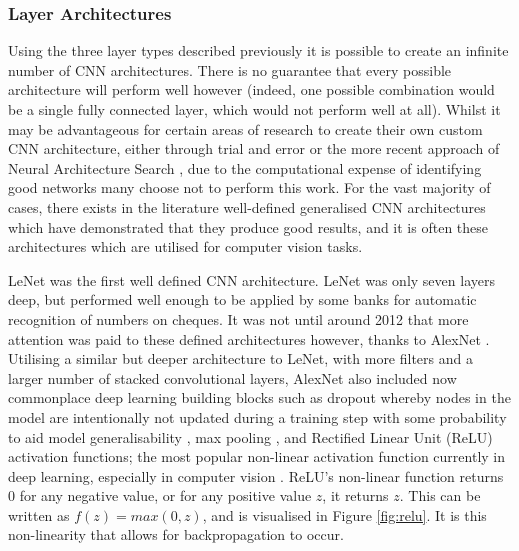 \subsubsection{Layer Architectures}\label{ch:Background,sec:CNN,sub:CNN,subsub:layerArchitecture}

Using the three layer types described previously it is possible to create an infinite number of CNN architectures. There is no guarantee that every possible architecture will perform well however (indeed, one possible combination would be a single fully connected layer, which would not perform well at all). Whilst it may be advantageous for certain areas of research to create their own custom CNN architecture, either through trial and error or the more recent approach of Neural Architecture Search \cite{elsken_neural_2018}, due to the computational expense of identifying good networks many choose not to perform this work. For the vast majority of cases, there exists in the literature well-defined generalised CNN architectures which have demonstrated that they produce good results, and it is often these architectures which are utilised for computer vision tasks. 

LeNet \cite{lecun_gradient-based_1998} was the first well defined CNN architecture. LeNet was only seven layers deep, but performed well enough to be applied by some banks for automatic recognition of numbers on cheques. It was not until around 2012 that more attention was paid to these defined architectures however, thanks to AlexNet \cite{krizhevsky_imagenet_2012}. Utilising a similar but deeper architecture to LeNet, with more filters and a larger number of stacked convolutional layers, AlexNet also included now commonplace deep learning building blocks such as dropout whereby nodes in the model are intentionally not updated during a training step with some probability to aid model generalisability \cite{srivastava_dropout:_2014}, max pooling \cite{boureau_theoretical_2010}, and Rectified Linear Unit (ReLU) activation functions; the most popular non-linear activation function currently in deep learning, especially in computer vision \cite{he_delving_2015}. ReLU's non-linear function returns 0 for any negative value, or for any positive value $z$, it returns $z$. This can be written as $f(z) = max(0, z)$, and is visualised in Figure \ref{fig:relu}. It is this non-linearity that allows for backpropagation to occur.

